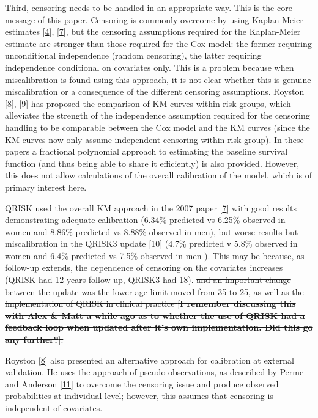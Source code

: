 \documentclass[
]{article}
\begin{document}
Third, censoring needs to be handled in an appropriate way. This is the core message of this paper. Censoring is commonly overcome by using Kaplan-Meier estimates {[}\protect\hyperlink{ref-royston_external_2013}{4}{]}, {[}\protect\hyperlink{ref-hippisley-cox_derivation_2007}{7}{]}, but the censoring assumptions required for the Kaplan-Meier estimate are stronger than those required for the Cox model: the former requiring unconditional independence (random censoring), the latter requiring independence conditional on covariates only. This is a problem because when miscalibration is found using this approach, it is not clear whether this is genuine miscalibration or a consequence of the different censoring assumptions. Royston {[}\protect\hyperlink{ref-royston_tools_2014}{8}{]}, {[}\protect\hyperlink{ref-royston_tools_2015}{9}{]} has proposed the comparison of KM curves within risk groups, which alleviates the strength of the independence assumption required for the censoring handling to be comparable between the Cox model and the KM curves (since the KM curves now only assume independent censoring within risk group). In these papers a fractional polynomial approach to estimating the baseline survival function (and thus being able to share it efficiently) is also provided. However, this does not allow calculations of the overall calibration of the model, which is of primary interest here.

QRISK used the overall KM approach in the 2007 paper {[}\protect\hyperlink{ref-hippisley-cox_derivation_2007}{7}{]} \sout{with good results} demonstrating adequate calibration (6.34\% predicted vs 6.25\% observed in women and 8.86\% predicted vs 8.88\% observed in men), \sout{but worse results} but miscalibration in the QRISK3 update {[}\protect\hyperlink{ref-hippisley-cox_development_2017}{10}{]} (4.7\% predicted v 5.8\% observed in women and 6.4\% predicted vs 7.5\% observed in men ). This may be because, as follow-up extends, the dependence of censoring on the covariates increases (QRISK had 12 years follow-up, QRISK3 had 18). \sout{and an important change between the update was the lower age limit moved from 35 to 25, as well as the implementation of QRISK in clinical practice {[}\textbf{I remember discussing this with Alex \& Matt a while ago as to whether the use of QRISK had a feedback loop when updated after it's own implementation. Did this go any further?}{]}.}

Royston {[}\protect\hyperlink{ref-royston_tools_2014}{8}{]} also presented an alternative approach for calibration at external validation. He uses the approach of pseudo-observations, as described by Perme and Anderson {[}\protect\hyperlink{ref-perme_checking_2008}{11}{]} to overcome the censoring issue and produce observed probabilities at individual level; however, this assumes that censoring is independent of covariates.
\end{document}
